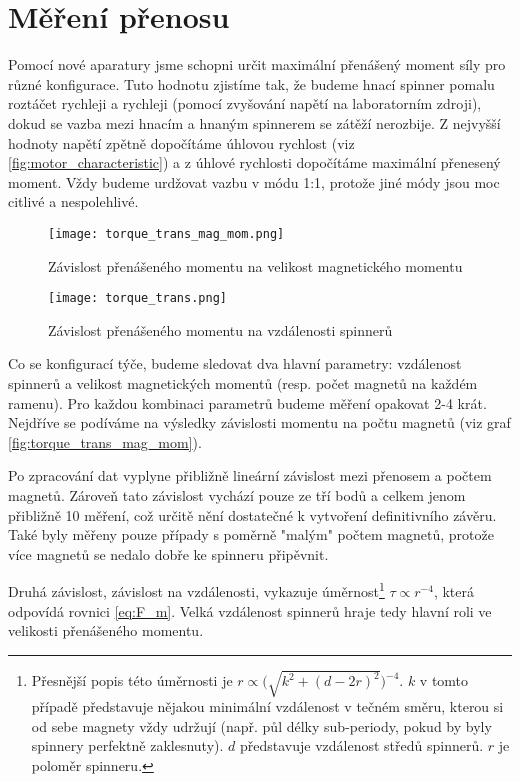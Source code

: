 \clearpage

\section{Měření přenosu}

Pomocí nové aparatury jsme schopni určit maximální přenášený moment síly pro různé konfigurace. Tuto hodnotu zjistíme tak, že budeme hnací spinner pomalu roztáčet rychleji a rychleji (pomocí zvyšování napětí na laboratorním zdroji), dokud se vazba mezi hnacím a hnaným spinnerem se zátěží nerozbije. Z nejvyšší hodnoty napětí zpětně dopočítáme úhlovou rychlost (viz \autoref{fig:motor_characteristic}) a z úhlové rychlosti dopočítáme maximální přenesený moment. Vždy budeme urdžovat vazbu v módu 1:1, protože jiné módy jsou moc citlivé a nespolehlivé.

\begin{wrapfigure}{r}{0.5\textwidth}
    \vspace{-1cm}
    \texttt{[image: torque\_trans\_mag\_mom.png]}
    \centering
    \caption{Závislost přenášeného momentu na velikost magnetického momentu}
    \label{fig:torque_trans_mag_mom}

    \vspace{1cm}
    \texttt{[image: torque\_trans.png]}
    \centering
    \caption{Závislost přenášeného momentu na vzdálenosti spinnerů}
    \label{fig:torque_trans}
\end{wrapfigure}

Co se konfigurací týče, budeme sledovat dva hlavní parametry: vzdálenost spinnerů a velikost magnetických momentů (resp. počet magnetů na každém ramenu). Pro každou kombinaci parametrů budeme měření opakovat 2-4 krát. Nejdříve se podíváme na výsledky závislosti momentu na počtu magnetů (viz graf \ref{fig:torque_trans_mag_mom}).

Po zpracování dat vyplyne přibližně lineární závislost mezi přenosem a počtem magnetů. Zároveň tato závislost vychází pouze ze tří bodů a celkem jenom přibližně 10 měření, což určitě nění dostatečné k vytvoření definitivního závěru. Také byly měřeny pouze případy s poměrně "malým" počtem magnetů, protože více magnetů se nedalo dobře ke spinneru připěvnit.

Druhá závislost, závislost na vzdálenosti, vykazuje úměrnost\footnote{Přesnější popis této úměrnosti je $r \propto \big( \sqrt{k^2+(d-2r)^2} \big)^{-4}$. $k$ v tomto případě představuje nějakou minimální vzdálenost v tečném směru, kterou si od sebe magnety vždy udržují (např. půl délky sub-periody, pokud by byly spinnery perfektně zaklesnuty). $d$ představuje vzdálenost středů spinnerů. $r$ je poloměr spinneru. } $\tau \propto r^{-4}$, která odpovídá rovnici \ref{eq:F_m}. Velká vzdálenost spinnerů hraje tedy hlavní roli ve velikosti přenášeného momentu.

\clearpage